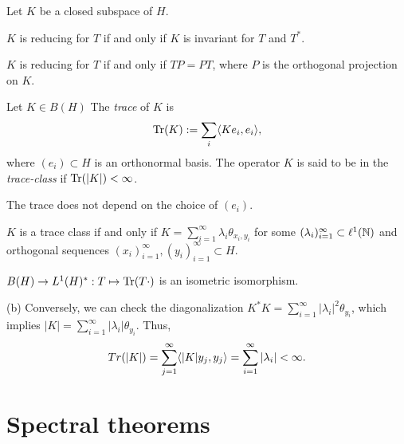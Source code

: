 \documentclass{../../large}
\begin{document}
\begin{prb}
Let $K$ be a closed subspace of $H$.
\begin{parts}
\item $K$ is reducing for $T$ if and only if $K$ is invariant for $T$ and $T^*$.
\item $K$ is reducing for $T$ if and only if $TP=PT$, where $P$ is the orthogonal projection on $K$.
\end{parts}
\end{prb}



\begin{prb}
Let $K\in B(H)$
The \emph{trace} of $K$ is
\[\operatorname{Tr}(K):=\sum_i\langle Ke_i,e_i\rangle,\]
where $(e_i)\subset H$ is an orthonormal basis.
The operator $K$ is said to be in the \emph{trace-class} if $\operatorname{Tr}(|K|)<\infty$.
\begin{parts}
\item
The trace does not depend on the choice of $(e_i)$.
\item
$K$ is a trace class if and only if $K=\sum_{i=1}^\infty\lambda_i\theta_{x_i,y_i}$ for some $(\lambda_i)_{i=1}^\infty\subset\ell^1(\mathbb{N})$ and orthogonal sequences $(x_i)_{i=1}^\infty,(y_i)_{i=1}^\infty\subset H$.
\item
$B(H)\to L^1(H)^*:T\mapsto\operatorname{Tr}(T\cdot)$ is an isometric isomorphism.
\end{parts}
\end{prb}
\begin{pf}
(b)
Conversely, we can check the diagonalization $K^*K=\sum_{i=1}^\infty|\lambda_i|^2\theta_{y_i}$, which implies $|K|=\sum_{i=1}^\infty|\lambda_i|\theta_{y_i}$.
Thus,
\[Tr(|K|)=\sum_{j=1}^\infty\langle|K|y_j,y_j\rangle=\sum_{i=1}^\infty|\lambda_i|<\infty.\]

\end{pf}








\section{Spectral theorems}
\end{document}
